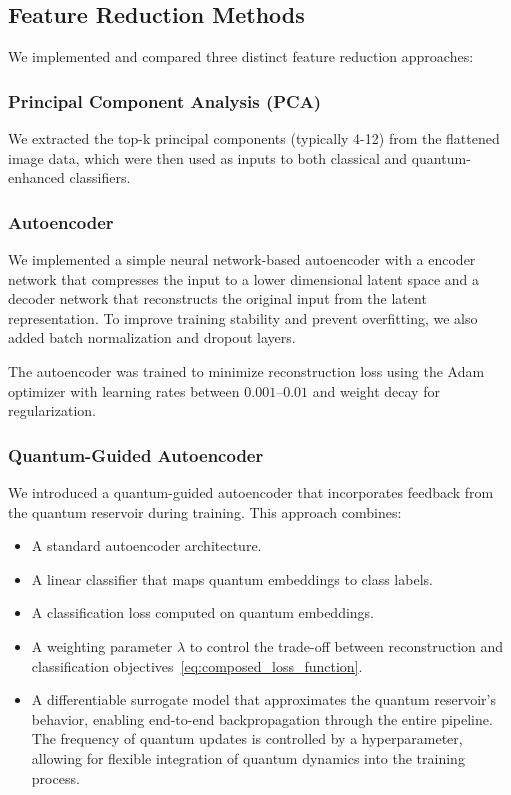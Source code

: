 \documentclass[conference]{IEEEtran}
\begin{document}
\subsection{Feature Reduction Methods}
We implemented and compared three distinct feature reduction approaches:
\subsubsection{Principal Component Analysis (PCA)}
We extracted the top-k principal components 
(typically 4-12) from the flattened image data, 
which were then used as inputs to both classical and 
quantum-enhanced classifiers.

\subsubsection{Autoencoder}
We implemented a simple neural network-based autoencoder with a encoder network that compresses the input to a lower dimensional latent space and a decoder network that reconstructs the original input from the latent representation. To improve training stability and prevent overfitting, we also added batch normalization and dropout layers.

The autoencoder was trained to minimize reconstruction loss using the Adam optimizer with learning rates between $0.001$--$0.01$ and weight decay for regularization.

\subsubsection{Quantum-Guided Autoencoder}
We introduced a quantum-guided autoencoder that incorporates feedback from the quantum reservoir during training. This approach combines:

\begin{itemize}
    \item A standard autoencoder architecture.
    \item A linear classifier that maps quantum embeddings to class labels.
    \item A classification loss computed on quantum embeddings.
    \item A weighting parameter $\lambda$ to control the trade-off between reconstruction and classification objectives~\eqref{eq:composed_loss_function}.
    \item A differentiable surrogate model that approximates the quantum reservoir's behavior, enabling end-to-end backpropagation through the entire pipeline. The frequency of quantum updates is controlled by a hyperparameter, allowing for flexible integration of quantum dynamics into the training process.
\end{itemize}
\end{document}
